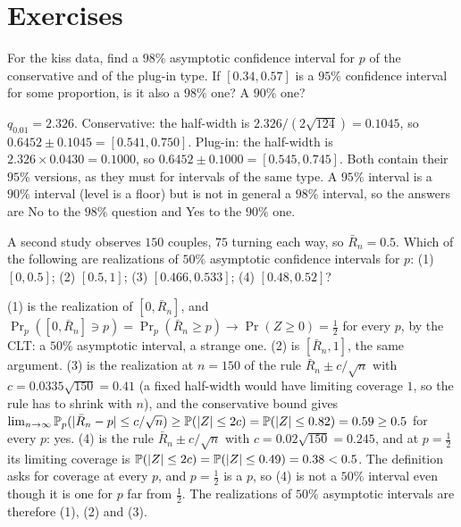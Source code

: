 \section{Exercises}
\label{sec:ci-exercises}

\begin{exercise}
\label{ex:ci-ninetyeight}
For the kiss data, find a $98\%$ asymptotic confidence interval for $p$ of the conservative and of the plug-in type. If $[0.34, 0.57]$ is a $95\%$ confidence interval for some proportion, is it also a $98\%$ one? A $90\%$ one?
\end{exercise}
\begin{solution}
$q_{0.01} = 2.326$. Conservative: the half-width is $2.326/(2\sqrt{124}) = 0.1045$, so $0.6452 \pm 0.1045 = [0.541, 0.750]$. Plug-in: the half-width is $2.326 \times 0.0430 = 0.1000$, so $0.6452 \pm 0.1000 = [0.545, 0.745]$. Both contain their $95\%$ versions, as they must for intervals of the same type. A $95\%$ interval is a $90\%$ interval (level is a floor) but is not in general a $98\%$ interval, so the answers are No to the $98\%$ question and Yes to the $90\%$ one.
\end{solution}

\begin{exercise}
\label{ex:ci-fifty}
A second study observes $150$ couples, $75$ turning each way, so $\bar{R}_n = 0.5$. Which of the following are realizations of $50\%$ asymptotic confidence intervals for $p$: (1) $[0, 0.5]$; (2) $[0.5, 1]$; (3) $[0.466, 0.533]$; (4) $[0.48, 0.52]$?
\end{exercise}
\begin{solution}
(1) is the realization of $[0, \bar{R}_n]$, and $\Pr_p([0, \bar{R}_n] \ni p) = \Pr_p(\bar{R}_n \geq p) \to \Pr(Z \geq 0) = \frac12$ for every $p$, by the CLT: a $50\%$ asymptotic interval, a strange one. (2) is $[\bar{R}_n, 1]$, the same argument. (3) is the realization at $n = 150$ of the rule $\bar{R}_n \pm c/\sqrt{n}$ with $c = 0.0335\sqrt{150} = 0.41$ (a fixed half-width would have limiting coverage $1$, so the rule has to shrink with $n$), and the conservative bound gives $\lim_{n \to \infty} \mathbb{P}_p(\lvert\bar{R}_n - p\rvert \leq c/\sqrt{n}) \geq \mathbb{P}(\lvert Z\rvert \leq 2c) = \mathbb{P}(\lvert Z\rvert \leq 0.82) = 0.59 \geq 0.5$ for every $p$: yes. (4) is the rule $\bar{R}_n \pm c/\sqrt{n}$ with $c = 0.02\sqrt{150} = 0.245$, and at $p = \frac12$ its limiting coverage is $\mathbb{P}(\lvert Z\rvert \leq 2c) = \mathbb{P}(\lvert Z\rvert \leq 0.49) = 0.38 < 0.5$. The definition asks for coverage at every $p$, and $p = \frac12$ is a $p$, so (4) is not a $50\%$ interval even though it is one for $p$ far from $\frac12$. The realizations of $50\%$ asymptotic intervals are therefore (1), (2) and (3).
\end{solution}

